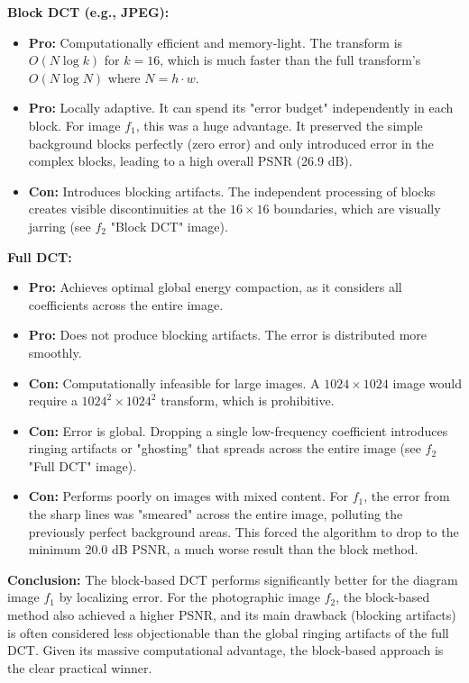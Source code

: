 \documentclass[11pt,a4paper]{article}
\begin{document}
\textbf{Block DCT (e.g., JPEG):}
\begin{itemize}
    \item \textbf{Pro:} Computationally efficient and memory-light. The transform is $O(N \log k)$ for $k=16$, which is much faster than the full transform's $O(N \log N)$ where $N=h \cdot w$.
    \item \textbf{Pro:} Locally adaptive. It can spend its "error budget" independently in each block. For image $f_1$, this was a huge advantage. It preserved the simple background blocks perfectly (zero error) and only introduced error in the complex blocks, leading to a high overall PSNR (26.9 dB).
    \item \textbf{Con:} Introduces blocking artifacts. The independent processing of blocks creates visible discontinuities at the $16 \times 16$ boundaries, which are visually jarring (see $f_2$ "Block DCT" image).
\end{itemize}

\textbf{Full DCT:}
\begin{itemize}
    \item \textbf{Pro:} Achieves optimal global energy compaction, as it considers all coefficients across the entire image.
    \item \textbf{Pro:} Does not produce blocking artifacts. The error is distributed more smoothly.
    \item \textbf{Con:} Computationally infeasible for large images. A $1024 \times 1024$ image would require a $1024^2 \times 1024^2$ transform, which is prohibitive.
    \item \textbf{Con:} Error is global. Dropping a single low-frequency coefficient introduces ringing artifacts or "ghosting" that spreads across the entire image (see $f_2$ "Full DCT" image).
    \item \textbf{Con:} Performs poorly on images with mixed content. For $f_1$, the error from the sharp lines was "smeared" across the entire image, polluting the previously perfect background areas. This forced the algorithm to drop to the minimum 20.0 dB PSNR, a much worse result than the block method.
\end{itemize}

\textbf{Conclusion:} The block-based DCT performs significantly better for the diagram image $f_1$ by localizing error. For the photographic image $f_2$, the block-based method also achieved a higher PSNR, and its main drawback (blocking artifacts) is often considered less objectionable than the global ringing artifacts of the full DCT. Given its massive computational advantage, the block-based approach is the clear practical winner.
\end{document}
